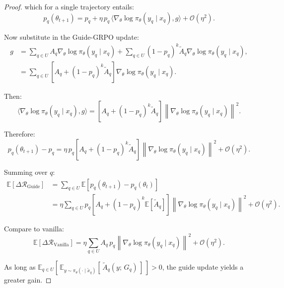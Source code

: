 \documentclass{article}
\newtheorem{proof}{Proof}
\begin{document}
{\begin{proof}
which for a single trajectory entails:
\begin{equation}
\label{eq:grad_expanded}
p_q(\theta_{t+1}) = p_q + \eta\, p_q\, \langle \nabla_\theta \log \pi_\theta(y_q \mid x_q), g \rangle + \mathcal{O}(\eta^2).
\end{equation}

Now substitute in the Guide-GRPO update:
\begin{align}
\label{eq:g_update1} g &= \sum_{q \in U} A_q \nabla_\theta \log \pi_\theta(y_q \mid x_q) + \sum_{q \in U} (1 - p_q)^k \tilde A_q \nabla_\theta \log \pi_\theta(y_q \mid x_q), \\
\label{eq:g_update2} &= \sum_{q \in U} \left[ A_q + (1 - p_q)^k \tilde A_q \right] \nabla_\theta \log \pi_\theta(y_q \mid x_q).
\end{align}

Then:
\begin{equation}
\label{eq:dot_product}
\langle \nabla_\theta \log \pi_\theta(y_q \mid x_q), g \rangle = \left[ A_q + (1 - p_q)^k \tilde A_q \right] \left\| \nabla_\theta \log \pi_\theta(y_q \mid x_q) \right\|^2.
\end{equation}

Therefore:
\begin{equation}
\label{eq:delta_pq}
p_q(\theta_{t+1}) - p_q = \eta\, p_q \left[ A_q + (1 - p_q)^k \tilde A_q \right] \left\| \nabla_\theta \log \pi_\theta(y_q \mid x_q) \right\|^2 + \mathcal{O}(\eta^2).
\end{equation}

Summing over $q$:
\begin{align}
\label{eq:deltaR_guide_1} \mathbb{E}[\Delta \mathcal{R}_{\text{Guide}}] &= \sum_{q \in U} \mathbb{E}[p_q(\theta_{t+1}) - p_q(\theta_t)] \\
\label{eq:deltaR_guide_2} &= \eta \sum_{q \in U} p_q \left[ A_q + (1 - p_q)^k \mathbb{E}[\tilde A_q] \right] \left\| \nabla_\theta \log \pi_\theta(y_q \mid x_q) \right\|^2 + \mathcal{O}(\eta^2).
\end{align}

Compare to vanilla:
\begin{equation}
\label{eq:deltaR_vanilla_expectation}
\mathbb{E}[\Delta \mathcal{R}_{\text{Vanilla}}] = \eta \sum_{q \in U} A_q\, p_q \left\| \nabla_\theta \log \pi_\theta(y_q \mid x_q) \right\|^2 + \mathcal{O}(\eta^2).
\end{equation}

As long as $\mathbb{E}_{q \in U} \left[\, \mathbb{E}_{y \sim \pi_\theta(\cdot \mid \tilde{x}_q)} \left[\, \tilde{A}_q(y;\, G_q) \,\right] \,\right] > 0$, the guide update yields a greater gain.
\end{proof}

}
\end{document}
